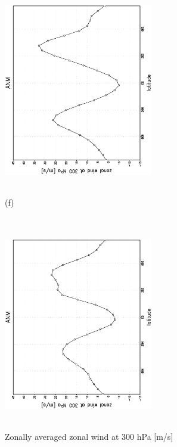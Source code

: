 \documentclass[12pt,a4paper,twoside,openright,headinclude,liststotoc,bibtotoc]{scrreprt}
\begin{document}
\begin{appendix}
\begin{figure}[c]
{\includegraphics[height=8.5cm,width=6.5cm,angle=-90]
{eps/zontmu_300.eps}
}
\parbox{8.5cm}{\hspace{0.80cm} \begin{scriptsize}(f) \end{scriptsize} \vspace{-0.5cm} \\
\includegraphics[height=8.5cm,width=6.5cm,angle=-90]
{eps/t21zontmuvel131300.eps}
}
\caption[Zonally averaged zonal wind at 300 hPa]{Zonally averaged zonal wind at 300 hPa [m/s]}
\label{img:uzon300}
\end{figure}



\end{appendix}
\end{document}
